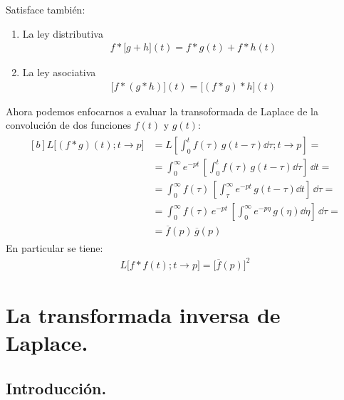 Satisface también:
\begin{enumerate}
\item La ley distributiva
\begin{align}
f * \big[g + h\big](t) = f * g(t) + f * h(t)
\label{eq:ecuacion_03_57}
\end{align}
\item La ley asociativa
\begin{align}
\big[f * (g * h)\big](t) = \big[(f * g) * h\big](t)
\label{eq:ecuacion_03_58}
\end{align}
\end{enumerate}
Ahora podemos enfocarnos a evaluar la transoformada de Laplace de la convolución de dos funciones $f(t)$ y $g(t)$:
\begin{align}
\begin{aligned}[b]
L \big[(f * g)(t); t \to p\big] &= L \left[ \int_{0}^{t} f(\tau) \, g(t - \tau) \dd{\tau}; t \to p \right] = \\[0.5em]
&= \int_{0}^{\infty} e^{-p t} \, \left[ \int_{0}^{t} f(\tau) \, g(t - \tau) \dd{\tau}\right] \, \dd{t} = \\[0.5em]
&= \int_{0}^{\infty} f(\tau) \, \left[ \int_{\tau}^{\infty} e^{-p t} \, g(t - \tau) \dd{t}\right] \, \dd{\tau} = \\[0.5em]
&= \int_{0}^{\infty} f(\tau) \, e^{- p t} \, \left[ \int_{0}^{\infty} e^{-p \eta} \, g(\eta) \dd{\eta} \right] \, \dd{\tau} = \\[0.5em]
&= \overline{f}(p) \, \overline{g}(p)
\end{aligned}
\label{eq:ecuacion_03_59}
\end{align}
En particular se tiene:
\begin{align*}
L \big[f * f(t); t \to p\big] = \big[\overline{f}(p)\big]^{2}
\end{align*}

\section{La transformada inversa de Laplace.}

\subsection{Introducción.}
